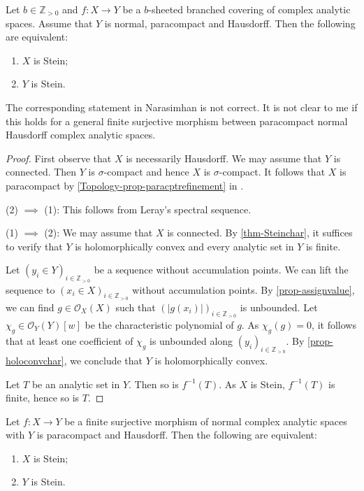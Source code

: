 \begin{lemma}\label{lma-branchedcovstein}
    Let $b\in \mathbb{Z}_{>0}$ and  $f:X\rightarrow Y$ be a $b$-sheeted branched covering of complex analytic spaces. Assume that $Y$ is normal, paracompact and Hausdorff. Then the following are equivalent:
    \begin{enumerate}
        \item $X$ is Stein;
        \item $Y$ is Stein.
    \end{enumerate}
\end{lemma}
The corresponding statement in Narasimhan is not correct. It is not clear to me if this holds for a general finite surjective morphism between paracompact normal Hausdorff complex analytic spaces.
\begin{proof}
    First observe that $X$ is necessarily Hausdorff.
    We may assume that $Y$ is connected. Then $Y$ is $\sigma$-compact and hence $X$ is $\sigma$-compact. It follows that $X$ is paracompact by \cref{Topology-prop-paracptrefinement} in .

    (2) $\implies$ (1): This follows from Leray's spectral sequence.

    (1) $\implies$ (2): We may assume that $X$ is connected. 
    By \cref{thm-Steinchar}, it suffices to verify that $Y$ is holomorphically convex and every analytic set in $Y$ is finite.
    
    Let $(y_i\in Y)_{i\in \mathbb{Z}_{>0}}$ be a sequence without accumulation points. We can lift the sequence to $(x_i\in X)_{i\in \mathbb{Z}_{>0}}$ without accumulation points. By \cref{prop-assignvalue}, we can find $g\in \mathcal{O}_X(X)$ such that $(|g(x_i)|)_{i\in \mathbb{Z}_{>0}}$ is unbounded. Let $\chi_g\in \mathcal{O}_Y(Y)[w]$ be the characteristic polynomial of $g$. As $\chi_g(g)=0$, it follows that at least one coefficient of $\chi_g$ is unbounded along $(y_i)_{i\in \mathbb{Z}_{>0}}$. By \cref{prop-holoconvchar}, we conclude that $Y$ is holomorphically convex.

    Let $T$ be an analytic set in $Y$. Then so is $f^{-1}(T)$. As $X$ is Stein, $f^{-1}(T)$ is finite, hence so is $T$.
\end{proof}
\begin{corollary}\label{cor-finitemorphismStein2}
    Let $f:X\rightarrow Y$ be a finite surjective morphism of normal complex analytic spaces with $Y$ is paracompact and Hausdorff. Then the following are equivalent:
    \begin{enumerate}
        \item $X$ is Stein;
        \item $Y$ is Stein.
    \end{enumerate}
\end{corollary}
